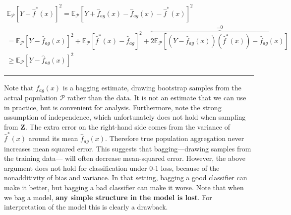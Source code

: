 \documentclass[twoside]{article}
\newenvironment{proof}{{\bf Proof:}}{\hfill\rule{2mm}{2mm}}
\begin{document}
\begin{proof}
\begin{align*}
       \mathbb{E}_{\mathcal{P}}[Y - \hat{f}^*(x)]^2 = \mathbb{E}_{\mathcal{P}}[Y +  \hat{f}_{ag}(x)- \hat{f}_{ag}(x) - \hat{f}^*(x)]^2  \\
       = \mathbb{E}_{\mathcal{P}}[Y - \hat{f}_{ag}(x)]^2 + \mathbb{E}_{\mathcal{P}}[\hat{f}^*(x) - \hat{f}_{ag} ]^2 + \overbrace{2\mathbb{E}_{\mathcal{P}}[(Y-\hat{f}_{ag}(x))( \hat{f}^*(x)) - \hat{f}_{ag}(x)]}^\text{=0} \\
       \geq \mathbb{E}_{\mathcal{P}}[Y - \hat{f}_{ag}(x)]^2
\end{align*}
\end{proof}


Note that
$f_{ag}(x)$ is a bagging estimate, drawing bootstrap samples from the actual population $\mathcal{P}$ rather than the data. It is not an estimate that we can use in practice, but is convenient for analysis. Furthermore, note the strong assumption of independence, which unfortunately does not hold when sampling from $\mathbf{Z}$. The extra error on the right-hand side comes from the variance of $\hat{f}^*(x)$ around its mean $\hat{f}_{ag}(x)$. Therefore true population aggregation never increases mean squared error. This suggests that bagging—drawing samples
from the training data— will often decrease mean-squared error.
However, the above argument does not hold for classification under 0-1 loss, because of the nonadditivity of bias and variance. In that setting, bagging a good classifier can make it better, but bagging a bad classifier can make it worse. Note that when we bag a model, \textbf{any simple structure in the model is lost}. For interpretation of the model this is clearly a drawback. 
\end{document}
